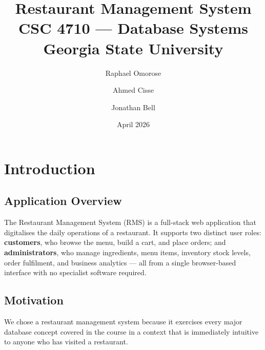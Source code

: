 \documentclass[12pt,a4paper]{article}
\title{
    \vspace{-1cm}
    \Large\textbf{Restaurant Management System} \\[6pt]
    \large CSC 4710 --- Database Systems \\[4pt]
    \normalsize Georgia State University
}
\author{
    Raphael Omorose \and Ahmed Cisse \and Jonathan Bell
}
\date{April 2026}
\begin{document}
\maketitle
\thispagestyle{fancy}

\tableofcontents
\newpage

\section{Introduction}

\subsection{Application Overview}

The Restaurant Management System (RMS) is a full-stack web application that
digitalises the daily operations of a restaurant. It supports two distinct user
roles: \textbf{customers}, who browse the menu, build a cart, and place orders;
and \textbf{administrators}, who manage ingredients, menu items, inventory stock
levels, order fulfilment, and business analytics --- all from a single
browser-based interface with no specialist software required.

\subsection{Motivation}

We chose a restaurant management system because it exercises every major database
concept covered in the course in a context that is immediately intuitive to anyone
who has visited a restaurant.
\end{document}
